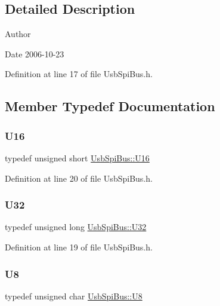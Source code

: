 \subsection{Detailed Description}
\begin{DoxyAuthor}{Author}

\end{DoxyAuthor}
\begin{DoxyDate}{Date}
2006-\/10-\/23 
\end{DoxyDate}


Definition at line 17 of file Usb\+Spi\+Bus.\+h.



\subsection{Member Typedef Documentation}
\mbox{\label{classUsbSpiBus_a741e3c698b080973693ceb990017a560}} 
\subsubsection{\texorpdfstring{U16}{U16}}
{\footnotesize\ttfamily typedef unsigned short \hyperlink{classUsbSpiBus_a741e3c698b080973693ceb990017a560}{Usb\+Spi\+Bus\+::\+U16}}



Definition at line 20 of file Usb\+Spi\+Bus.\+h.

\mbox{\label{classUsbSpiBus_a9b24e28662a35ca57f5ed32c41c5f3ff}} 
\subsubsection{\texorpdfstring{U32}{U32}}
{\footnotesize\ttfamily typedef unsigned long \hyperlink{classUsbSpiBus_a9b24e28662a35ca57f5ed32c41c5f3ff}{Usb\+Spi\+Bus\+::\+U32}}



Definition at line 19 of file Usb\+Spi\+Bus.\+h.

\mbox{\label{classUsbSpiBus_a11336f4ad104fbd4fb454be044f19fc8}} 
\subsubsection{\texorpdfstring{U8}{U8}}
{\footnotesize\ttfamily typedef unsigned char \hyperlink{classUsbSpiBus_a11336f4ad104fbd4fb454be044f19fc8}{Usb\+Spi\+Bus\+::\+U8}}



